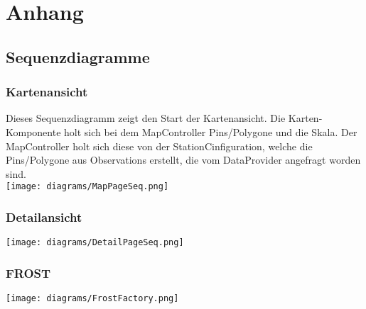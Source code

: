 \section{Anhang}
\subsection{Sequenzdiagramme}
\subsubsection*{Kartenansicht}
Dieses Sequenzdiagramm zeigt den Start der \gls{Kartenansicht}. Die Karten-Komponente holt sich bei dem MapController Pins/Polygone und die Skala. 
Der MapController holt sich diese von der StationCinfiguration, welche die Pins/Polygone aus Observations erstellt, die vom DataProvider angefragt worden sind.
\\
\texttt{[image: diagrams/MapPageSeq.png]}

\subsubsection*{Detailansicht}
\texttt{[image: diagrams/DetailPageSeq.png]}

\subsubsection*{FROST}
\texttt{[image: diagrams/FrostFactory.png]}